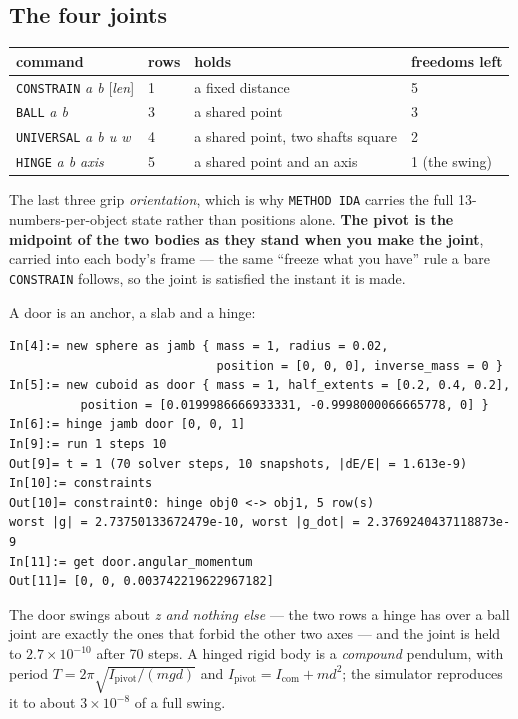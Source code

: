 \documentclass[11pt]{article}
\newcommand{\kw}[1]{\texttt{\uppercase{#1}}}
\begin{document}
\subsection{The four joints}

\begin{center}
\begin{tabular}{p{4.6cm}p{1.2cm}p{4.4cm}p{3.4cm}}
\textbf{command} & \textbf{rows} & \textbf{holds} & \textbf{freedoms left}\\\hline
\kw{constrain} \emph{a b} [\emph{len}] & 1 & a fixed distance & 5\\
\kw{ball} \emph{a b} & 3 & a shared point & 3\\
\kw{universal} \emph{a b u w} & 4 & a shared point, two shafts square & 2\\
\kw{hinge} \emph{a b axis} & 5 & a shared point and an axis & 1 (the swing)\\
\end{tabular}
\end{center}

The last three grip \emph{orientation}, which is why \kw{method ida}
carries the full 13-numbers-per-object state rather than positions
alone. \textbf{The pivot is the midpoint of the two bodies as they stand
when you make the joint}, carried into each body's frame --- the same
``freeze what you have'' rule a bare \kw{constrain} follows, so the joint
is satisfied the instant it is made.

A door is an anchor, a slab and a hinge:

\begin{lstlisting}
In[4]:= new sphere as jamb { mass = 1, radius = 0.02,
                             position = [0, 0, 0], inverse_mass = 0 }
In[5]:= new cuboid as door { mass = 1, half_extents = [0.2, 0.4, 0.2],
          position = [0.0199986666933331, -0.9998000066665778, 0] }
In[6]:= hinge jamb door [0, 0, 1]
In[9]:= run 1 steps 10
Out[9]= t = 1 (70 solver steps, 10 snapshots, |dE/E| = 1.613e-9)
In[10]:= constraints
Out[10]= constraint0: hinge obj0 <-> obj1, 5 row(s)
worst |g| = 2.73750133672479e-10, worst |g_dot| = 2.3769240437118873e-9
In[11]:= get door.angular_momentum
Out[11]= [0, 0, 0.003742219622967182]
\end{lstlisting}

The door swings about \emph{z and nothing else} --- the two rows a hinge
has over a ball joint are exactly the ones that forbid the other two
axes --- and the joint is held to $2.7\times10^{-10}$ after 70 steps. A
hinged rigid body is a \emph{compound} pendulum, with period
$T = 2\pi\sqrt{I_{\text{pivot}}/(mgd)}$ and
$I_{\text{pivot}} = I_{\text{com}} + md^2$; the simulator reproduces it
to about $3\times10^{-8}$ of a full swing.
\end{document}
